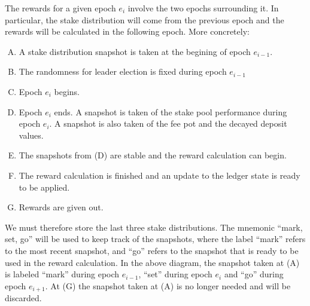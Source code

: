 The rewards for a given epoch $e_i$ involve the two epochs surrounding it.
In particular, the stake distribution will come from the previous epoch
and the rewards will be calculated in the following epoch.
More concretely:
\begin{enumerate}[(A)]%
  \item A stake distribution snapshot is taken at the begining of epoch $e_{i-1}$.
  \item The randomness for leader election is fixed during epoch $e_{i-1}$
  \item Epoch $e_{i}$ begins.
  \item Epoch $e_{i}$ ends.
    A snapshot is taken of the stake pool performance during epoch $e_{i}$.
    A snapshot is also taken of the fee pot and the decayed deposit values.
  \item The snapshots from (D) are stable and the reward calculation can begin.
  \item The reward calculation is finished and an update to the ledger state
    is ready to be applied.
  \item Rewards are given out.
\end{enumerate}

\usetikzlibrary{decorations.pathreplacing}

We must therefore store the last three stake distributions.
The mnemonic ``mark, set, go'' will be used to keep
track of the snapshots, where the label ``mark'' refers to the most recent snapshot,
and ``go'' refers to the snapshot that is ready to be used in the reward calculation.
In the above diagram, the snapshot taken at (A) is labeled ``mark'' during epoch $e_{i-1}$,
``set'' during epoch $e_i$ and ``go'' during epoch $e_{i+1}$. At (G) the snapshot
taken at (A) is no longer needed and will be discarded.

